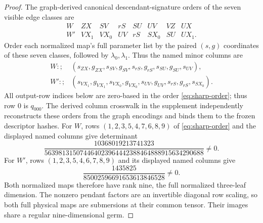 \documentclass[11pt]{article}
\theoremstyle{remark}
\newcommand{\1}{\mathbf 1}
\begin{document}
\begin{proof}
The graph-derived canonical descendant-signature orders of the seven visible
edge classes are
\[
 \begin{array}{c|ccccccc}
 W&ZX&SV&rS&SU&UV&VZ&UX\\
 W'&VX_1&VX_0&UV&rS&SX_0&SU&UX_1.
 \end{array}
\]
Order each normalized map's full parameter list by the paired \((s,g)\)
coordinates of these seven classes, followed by \(\lambda_0,\lambda_1\).
Thus the named minor columns are
\[
 \begin{aligned}
 W:;&(s_{ZX},g_{ZX},s_{SV},g_{SV},s_{rS},g_{rS},
       s_{SU},g_{SU},s_{UV}),\\
 W':;&(s_{VX_1},g_{VX_1},s_{VX_0},g_{VX_0},s_{UV},g_{UV},
       s_{rS},g_{rS},s_{SX_0}).
 \end{aligned}
\]
All output-row indices below are zero-based in the order
\eqref{eq:sharp-order}; thus row \(0\) is \(q_{000}\).
The derived column crosswalk in the supplement independently reconstructs
these orders from the graph encodings and binds them to the frozen descriptor
hashes.  For \(W\), rows \((1,2,3,5,4,7,6,8,9)\) of
\eqref{eq:sharp-order} and the displayed named columns give determinant
\[
 \frac{10368019213741323}
 {563981315074464023964442388464888915634290688}\ne0.
\]
For \(W'\), rows \((1,2,3,5,4,6,7,8,9)\) and its displayed named columns give
\[
 \frac{1435825}{85002596691653613846528}\ne0.
\]
Both normalized maps therefore have rank nine, the full normalized three-leaf
dimension.  The nonzero pendant factors are an invertible diagonal row
scaling, so both full physical maps are submersions at their common tensor.
Their images share a regular nine-dimensional germ.


\end{proof}
\end{document}
